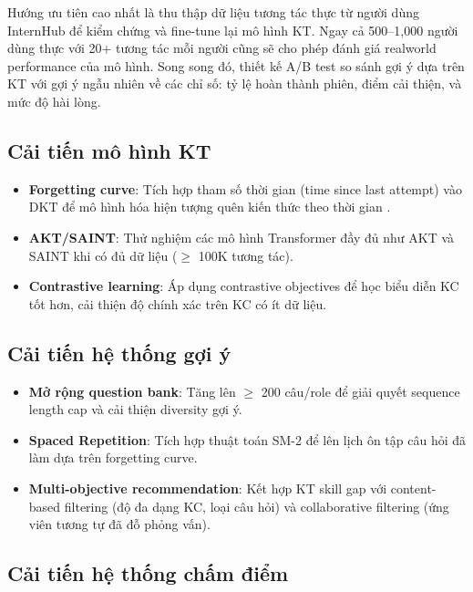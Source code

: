 \documentclass[12pt, a4paper]{report}
\begin{document}
Hướng ưu tiên cao nhất là thu thập dữ liệu tương tác thực từ người dùng InternHub để kiểm chứng và fine-tune lại mô hình KT. Ngay cả 500--1{,}000 người dùng thực với 20+ tương tác mỗi người cũng sẽ cho phép đánh giá realworld performance của mô hình. Song song đó, thiết kế A/B test so sánh gợi ý dựa trên KT với gợi ý ngẫu nhiên về các chỉ số: tỷ lệ hoàn thành phiên, điểm cải thiện, và mức độ hài lòng.

\subsection{Cải tiến mô hình KT}

\begin{itemize}
  \item \textbf{Forgetting curve}: Tích hợp tham số thời gian (time since last attempt) vào DKT để mô hình hóa hiện tượng quên kiến thức theo thời gian \cite{ebbinghaus1885memory}.
  \item \textbf{AKT/SAINT}: Thử nghiệm các mô hình Transformer đầy đủ như AKT \cite{ghosh2020context} và SAINT \cite{choi2020towards} khi có đủ dữ liệu ($\geq$ 100K tương tác).
  \item \textbf{Contrastive learning}: Áp dụng contrastive objectives để học biểu diễn KC tốt hơn, cải thiện độ chính xác trên KC có ít dữ liệu.
\end{itemize}

\subsection{Cải tiến hệ thống gợi ý}

\begin{itemize}
  \item \textbf{Mở rộng question bank}: Tăng lên $\geq$ 200 câu/role để giải quyết sequence length cap và cải thiện diversity gợi ý.
  \item \textbf{Spaced Repetition}: Tích hợp thuật toán SM-2 \cite{wozniak1990optimization} để lên lịch ôn tập câu hỏi đã làm dựa trên forgetting curve.
  \item \textbf{Multi-objective recommendation}: Kết hợp KT skill gap với content-based filtering (độ đa dạng KC, loại câu hỏi) và collaborative filtering (ứng viên tương tự đã đỗ phỏng vấn).
\end{itemize}

\subsection{Cải tiến hệ thống chấm điểm}
\end{document}
